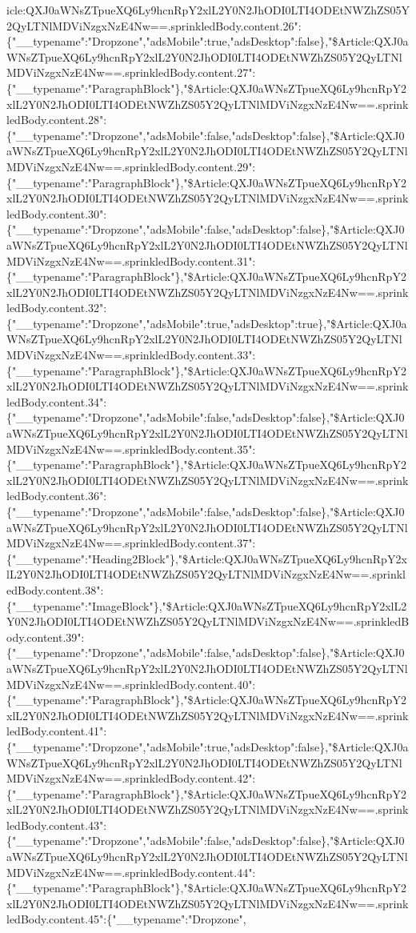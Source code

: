 icle:QXJ0aWNsZTpueXQ6Ly9hcnRpY2xlL2Y0N2JhODI0LTI4ODEtNWZhZS05Y2QyLTNlMDViNzgxNzE4Nw==.sprinkledBody.content.26":\{"\_\_typename":"Dropzone","adsMobile":true,"adsDesktop":false\},"\$Article:QXJ0aWNsZTpueXQ6Ly9hcnRpY2xlL2Y0N2JhODI0LTI4ODEtNWZhZS05Y2QyLTNlMDViNzgxNzE4Nw==.sprinkledBody.content.27":\{"\_\_typename":"ParagraphBlock"\},"\$Article:QXJ0aWNsZTpueXQ6Ly9hcnRpY2xlL2Y0N2JhODI0LTI4ODEtNWZhZS05Y2QyLTNlMDViNzgxNzE4Nw==.sprinkledBody.content.28":\{"\_\_typename":"Dropzone","adsMobile":false,"adsDesktop":false\},"\$Article:QXJ0aWNsZTpueXQ6Ly9hcnRpY2xlL2Y0N2JhODI0LTI4ODEtNWZhZS05Y2QyLTNlMDViNzgxNzE4Nw==.sprinkledBody.content.29":\{"\_\_typename":"ParagraphBlock"\},"\$Article:QXJ0aWNsZTpueXQ6Ly9hcnRpY2xlL2Y0N2JhODI0LTI4ODEtNWZhZS05Y2QyLTNlMDViNzgxNzE4Nw==.sprinkledBody.content.30":\{"\_\_typename":"Dropzone","adsMobile":false,"adsDesktop":false\},"\$Article:QXJ0aWNsZTpueXQ6Ly9hcnRpY2xlL2Y0N2JhODI0LTI4ODEtNWZhZS05Y2QyLTNlMDViNzgxNzE4Nw==.sprinkledBody.content.31":\{"\_\_typename":"ParagraphBlock"\},"\$Article:QXJ0aWNsZTpueXQ6Ly9hcnRpY2xlL2Y0N2JhODI0LTI4ODEtNWZhZS05Y2QyLTNlMDViNzgxNzE4Nw==.sprinkledBody.content.32":\{"\_\_typename":"Dropzone","adsMobile":true,"adsDesktop":true\},"\$Article:QXJ0aWNsZTpueXQ6Ly9hcnRpY2xlL2Y0N2JhODI0LTI4ODEtNWZhZS05Y2QyLTNlMDViNzgxNzE4Nw==.sprinkledBody.content.33":\{"\_\_typename":"ParagraphBlock"\},"\$Article:QXJ0aWNsZTpueXQ6Ly9hcnRpY2xlL2Y0N2JhODI0LTI4ODEtNWZhZS05Y2QyLTNlMDViNzgxNzE4Nw==.sprinkledBody.content.34":\{"\_\_typename":"Dropzone","adsMobile":false,"adsDesktop":false\},"\$Article:QXJ0aWNsZTpueXQ6Ly9hcnRpY2xlL2Y0N2JhODI0LTI4ODEtNWZhZS05Y2QyLTNlMDViNzgxNzE4Nw==.sprinkledBody.content.35":\{"\_\_typename":"ParagraphBlock"\},"\$Article:QXJ0aWNsZTpueXQ6Ly9hcnRpY2xlL2Y0N2JhODI0LTI4ODEtNWZhZS05Y2QyLTNlMDViNzgxNzE4Nw==.sprinkledBody.content.36":\{"\_\_typename":"Dropzone","adsMobile":false,"adsDesktop":false\},"\$Article:QXJ0aWNsZTpueXQ6Ly9hcnRpY2xlL2Y0N2JhODI0LTI4ODEtNWZhZS05Y2QyLTNlMDViNzgxNzE4Nw==.sprinkledBody.content.37":\{"\_\_typename":"Heading2Block"\},"\$Article:QXJ0aWNsZTpueXQ6Ly9hcnRpY2xlL2Y0N2JhODI0LTI4ODEtNWZhZS05Y2QyLTNlMDViNzgxNzE4Nw==.sprinkledBody.content.38":\{"\_\_typename":"ImageBlock"\},"\$Article:QXJ0aWNsZTpueXQ6Ly9hcnRpY2xlL2Y0N2JhODI0LTI4ODEtNWZhZS05Y2QyLTNlMDViNzgxNzE4Nw==.sprinkledBody.content.39":\{"\_\_typename":"Dropzone","adsMobile":false,"adsDesktop":false\},"\$Article:QXJ0aWNsZTpueXQ6Ly9hcnRpY2xlL2Y0N2JhODI0LTI4ODEtNWZhZS05Y2QyLTNlMDViNzgxNzE4Nw==.sprinkledBody.content.40":\{"\_\_typename":"ParagraphBlock"\},"\$Article:QXJ0aWNsZTpueXQ6Ly9hcnRpY2xlL2Y0N2JhODI0LTI4ODEtNWZhZS05Y2QyLTNlMDViNzgxNzE4Nw==.sprinkledBody.content.41":\{"\_\_typename":"Dropzone","adsMobile":true,"adsDesktop":false\},"\$Article:QXJ0aWNsZTpueXQ6Ly9hcnRpY2xlL2Y0N2JhODI0LTI4ODEtNWZhZS05Y2QyLTNlMDViNzgxNzE4Nw==.sprinkledBody.content.42":\{"\_\_typename":"ParagraphBlock"\},"\$Article:QXJ0aWNsZTpueXQ6Ly9hcnRpY2xlL2Y0N2JhODI0LTI4ODEtNWZhZS05Y2QyLTNlMDViNzgxNzE4Nw==.sprinkledBody.content.43":\{"\_\_typename":"Dropzone","adsMobile":false,"adsDesktop":false\},"\$Article:QXJ0aWNsZTpueXQ6Ly9hcnRpY2xlL2Y0N2JhODI0LTI4ODEtNWZhZS05Y2QyLTNlMDViNzgxNzE4Nw==.sprinkledBody.content.44":\{"\_\_typename":"ParagraphBlock"\},"\$Article:QXJ0aWNsZTpueXQ6Ly9hcnRpY2xlL2Y0N2JhODI0LTI4ODEtNWZhZS05Y2QyLTNlMDViNzgxNzE4Nw==.sprinkledBody.content.45":\{"\_\_typename":"Dropzone",